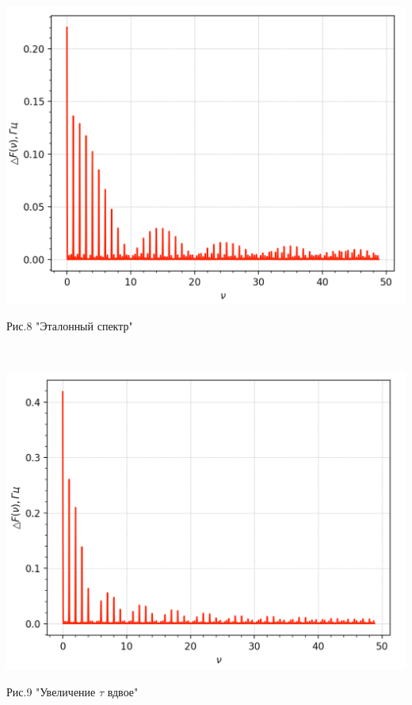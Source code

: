 \documentclass[a4paper,12pt]{article} %
\begin{document}
\begin{minipage}{0.44\textwidth}
\includegraphics[width=\linewidth]{1.png}\\
\begin{center}
Рис.8 "Эталонный спектр"
\end{center}
\end{minipage}
\begin{minipage}{0.1\textwidth}
\ \ \ \ \ \ \Rightarrow
\end{minipage}
\begin{minipage}{0.44\textwidth}
\includegraphics[width=\linewidth]{2.png}\\
\begin{center}
Рис.9 "Увеличение $\tau$ вдвое"
\end{center}
\end{minipage}
\end{document}
